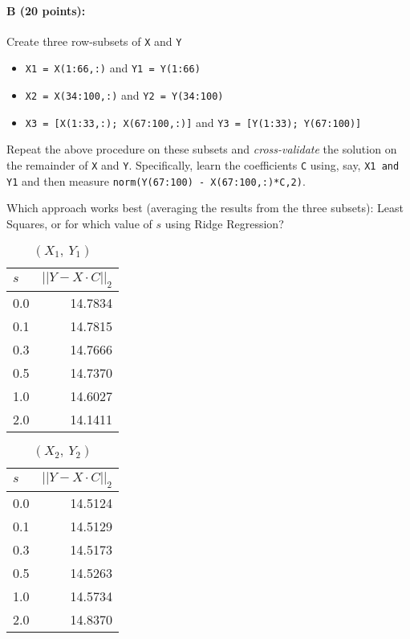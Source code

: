 \documentclass[11pt]{article}
\begin{document}
\paragraph{B (20 points): }
Create three row-subsets of \texttt{X} and \texttt{Y}
\begin{itemize} \denselist
\item \texttt{X1 = X(1:66,:)} and \texttt{Y1 = Y(1:66)}
\item \texttt{X2 = X(34:100,:)} and \texttt{Y2 = Y(34:100)}
\item \texttt{X3 = [X(1:33,:); X(67:100,:)]} and \texttt{Y3 = [Y(1:33); Y(67:100)]}
\end{itemize}

Repeat the above procedure on these subsets and \emph{cross-validate} the solution on the remainder of \texttt{X} and \texttt{Y}.  Specifically, learn the coefficients \texttt{C} using, say, \texttt{X1 and Y1} and then measure \texttt{norm(Y(67:100) - X(67:100,:)*C,2)}.  

Which approach works best (averaging the results from the three subsets): Least Squares, or for which value of $s$ using Ridge Regression?  

\begin{table}[H]
\centering
\caption{$(X_{1},\ Y_{1})$}
\begin{tabular}{@{}l r@{}}
\hline\hline
$s$ & $\left|\left| Y - X\cdot C\right|\right|_{2}$\\
\hline
0.0 & 14.7834 \\
0.1 & 14.7815 \\
0.3 & 14.7666 \\
0.5 & 14.7370 \\
1.0 & 14.6027 \\
2.0 & 14.1411 \\
\hline
\end{tabular}
\end{table}

\begin{table}[H]
\centering
\caption{$(X_{2},\ Y_{2})$}
\begin{tabular}{@{}l r@{}}
\hline\hline
$s$ & $\left|\left| Y - X\cdot C\right|\right|_{2}$\\
\hline
0.0 & 14.5124 \\
0.1 & 14.5129 \\
0.3 & 14.5173 \\
0.5 & 14.5263 \\
1.0 & 14.5734 \\
2.0 & 14.8370 \\
\hline
\end{tabular}
\end{table}
\end{document}
